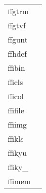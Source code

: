 \documentclass[11pt]{book}
\begin{document}
\begin{tabular}{lr}
ffgtrm  & \pageref{ffgtrm} \\
ffgtvf  & \pageref{ffgtvf} \\
ffgunt     & \pageref{ffgunt} \\
ffhdef    & \pageref{ffhdef} \\
ffibin    & \pageref{ffibin} \\
fficls  & \pageref{fficls} \\
fficol   & \pageref{fficol} \\
ffifile  & \pageref{ffiurl} \\
ffiimg     & \pageref{ffiimg} \\
ffikls    & \pageref{ffikyx} \\
ffikyu   & \pageref{ffikyu} \\
ffiky\_    & \pageref{ffikyx} \\
ffimem  & \pageref{ffimem} \\

\end{tabular}
\end{document}
